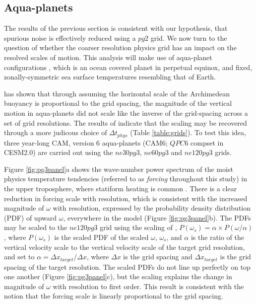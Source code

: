 \documentclass{agujournal}
\begin{document}
\subsection{Aqua-planets}

The results of the previous section is consistent with our hypothesis, that spurious noise is effectively reduced using a $pg2$ grid. We now turn to the question of whether the coarser resolution physics grid has an impact on the resolved scales of motion. This analysis will make use of aqua-planet configurations \citep{NH2000ASL}, which is an ocean covered planet in perpetual equinox, and fixed, zonally-symmetric sea surface temperatures resembling that of Earth.

\cite{HR2017JCLIM} has shown that through assuming the horizontal scale of the Archimedean buoyancy is proportional to the grid spacing, the magnitude of the vertical motion in aqua-planets did not scale like the inverse of the grid-spacing across a set of grid resolutions. The results of \cite{HR2018JAMES} indicate that the scaling may be recovered through a more judicous choice of $\Delta t_{phys}$ (Table \ref{table:grids}). To test this idea, three year-long CAM, version 6 aqua-planets (CAM6; $QPC6$ compset in CESM2.0) are carried out using the $ne30pg3$, $ne60pg3$ and $ne120pg3$ grids. 

Figure \ref{fig:pg3panel}a shows the wave-number power spectrum of the moist physics temperature tendencies (referred to as {\em{forcing}} throughout this study) in the upper troposphere, where statiform heating is common \citep{HR2018JAMES}. There is a clear reduction in forcing scale with resolution, which is consistent with the increased magnitude of $\omega$ with resolution, expressed by the probability density distribution (PDF) of upward $\omega$, everywhere in the model (Figure \ref{fig:pg3panel}b). The PDFs may be scaled to the $ne120pg3$ grid using the scaling of \cite{HR2018JAMES}, $P(\omega_{s}) = \alpha \times P(\omega/\alpha)$, where $P(\omega_{s})$ is the scaled PDF of the scaled $\omega$, $\omega_{s}$, and $\alpha$ is the ratio of the vertical velocity scale to the vertical velocity scale of the target grid resolution, and set to $\alpha = \Delta x_{target}/\Delta x$, where $\Delta x$ is the grid spacing and $\Delta x_{target}$ is the grid spacing of the target resolution. The scaled PDFs do not line up perfectly on top one another (Figure \ref{fig:pg3panel}c), but the scaling explains the change in magnitude of $\omega$ with resolution to first order. This result is consistent with the notion that the forcing scale is linearly proportional to the grid spacing.
\end{document}
